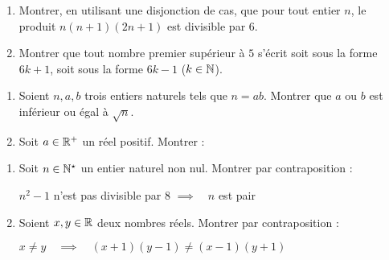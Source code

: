 \documentclass[11pt,class=report,crop=false]{standalone}
\begin{document}


\bigskip
\bigskip



\exercice{}
\sauteligne
\begin{enumerate}
    \item Montrer, en utilisant une disjonction de cas, que pour tout entier $n$, le produit $n(n+1)(2n+1)$ est divisible par $6$.
    
    \item Montrer que tout nombre premier supérieur à $5$ s'écrit soit sous la forme $6k+1$, soit sous la forme $6k-1$ ($k \in \mathbb{N}$).
\end{enumerate}
\finenonce

\finexercice


\exercice{}
\sauteligne
\begin{enumerate}
    \item Soient $n, a, b$ trois entiers naturels tels que $n=ab$. Montrer que $a$ ou $b$ est inférieur ou égal à $\sqrt{n}$.
    
    \item Soit $a \in \mathbb{R}^+$ un réel positif. Montrer :
\end{enumerate} 
\finenonce

\finexercice



\exercice{}
\sauteligne
\begin{enumerate}
    \item Soit $n \in \mathbb{N}^\star$ un entier naturel non nul. Montrer par contraposition :\\
    \centerline{$n^2-1$ n'est pas divisible par $8$ \quad $\implies \quad n$ est pair}
    
    \item Soient $x,y \in \mathbb{R}$ deux nombres réels. Montrer par contraposition :\\
    \centerline{$x\neq y \quad  \implies \quad (x+1)(y-1)\neq (x-1)(y+1)$}
\end{enumerate}
\finenonce

\finexercice
\end{document}
